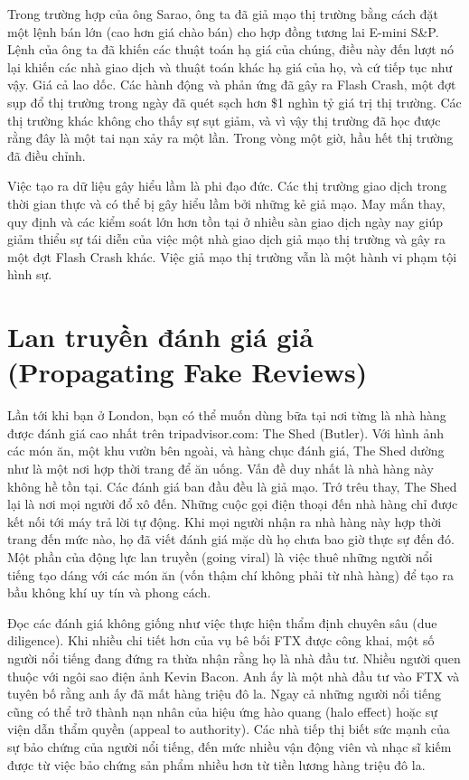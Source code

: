 Trong trường hợp của ông Sarao, ông ta đã giả mạo thị trường bằng cách đặt một lệnh bán lớn (cao hơn giá chào bán) cho hợp đồng tương lai E-mini S\&P. Lệnh của ông ta đã khiến các thuật toán hạ giá của chúng, điều này đến lượt nó lại khiến các nhà giao dịch và thuật toán khác hạ giá của họ, và cứ tiếp tục như vậy. Giá cả lao dốc. Các hành động và phản ứng đã gây ra Flash Crash, một đợt sụp đổ thị trường trong ngày đã quét sạch hơn \$1 nghìn tỷ giá trị thị trường. Các thị trường khác không cho thấy sự sụt giảm, và vì vậy thị trường đã học được rằng đây là một tai nạn xảy ra một lần. Trong vòng một giờ, hầu hết thị trường đã điều chỉnh.

Việc tạo ra dữ liệu gây hiểu lầm là phi đạo đức. Các thị trường giao dịch trong thời gian thực và có thể bị gây hiểu lầm bởi những kẻ giả mạo. May mắn thay, quy định và các kiểm soát lớn hơn tồn tại ở nhiều sàn giao dịch ngày nay giúp giảm thiểu sự tái diễn của việc một nhà giao dịch giả mạo thị trường và gây ra một đợt Flash Crash khác. Việc giả mạo thị trường vẫn là một hành vi phạm tội hình sự.

\section{Lan truyền đánh giá giả (Propagating Fake Reviews)}

Lần tới khi bạn ở London, bạn có thể muốn dùng bữa tại nơi từng là nhà hàng được đánh giá cao nhất trên tripadvisor.com: The Shed (Butler). Với hình ảnh các món ăn, một khu vườn bên ngoài, và hàng chục đánh giá, The Shed dường như là một nơi hợp thời trang để ăn uống. Vấn đề duy nhất là nhà hàng này không hề tồn tại. Các đánh giá ban đầu đều là giả mạo. Trớ trêu thay, The Shed lại là nơi mọi người đổ xô đến. Những cuộc gọi điện thoại đến nhà hàng chỉ được kết nối tới máy trả lời tự động. Khi mọi người nhận ra nhà hàng này hợp thời trang đến mức nào, họ đã viết đánh giá mặc dù họ chưa bao giờ thực sự đến đó. Một phần của động lực lan truyền (going viral) là việc thuê những người nổi tiếng tạo dáng với các món ăn (vốn thậm chí không phải từ nhà hàng) để tạo ra bầu không khí uy tín và phong cách.

Đọc các đánh giá không giống như việc thực hiện thẩm định chuyên sâu (due diligence). Khi nhiều chi tiết hơn của vụ bê bối FTX được công khai, một số người nổi tiếng đang đứng ra thừa nhận rằng họ là nhà đầu tư. Nhiều người quen thuộc với ngôi sao điện ảnh Kevin Bacon. Anh ấy là một nhà đầu tư vào FTX và tuyên bố rằng anh ấy đã mất hàng triệu đô la. Ngay cả những người nổi tiếng cũng có thể trở thành nạn nhân của hiệu ứng hào quang (halo effect) hoặc sự viện dẫn thẩm quyền (appeal to authority). Các nhà tiếp thị biết sức mạnh của sự bảo chứng của người nổi tiếng, đến mức nhiều vận động viên và nhạc sĩ kiếm được từ việc bảo chứng sản phẩm nhiều hơn từ tiền lương hàng triệu đô la.

